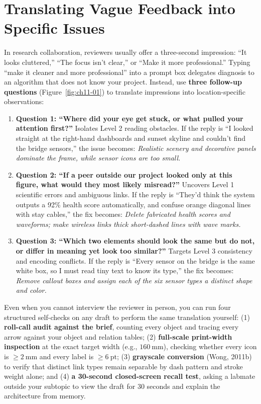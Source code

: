 \section{Translating Vague Feedback into Specific Issues}

In research collaboration, reviewers usually offer a three-second impression: ``It looks cluttered,'' ``The focus isn't clear,'' or ``Make it more professional.'' Typing ``make it cleaner and more professional'' into a prompt box delegates diagnosis to an algorithm that does not know your project. Instead, use \textbf{three follow-up questions} (Figure~\ref{fig:ch11-01}) to translate impressions into location-specific observations:

\begin{enumerate}
\item \textbf{Question 1: ``Where did your eye get stuck, or what pulled your attention first?''} Isolates Level 2 reading obstacles. If the reply is ``I looked straight at the right-hand dashboards and sunset skyline and couldn't find the bridge sensors,'' the issue becomes: \emph{Realistic scenery and decorative panels dominate the frame, while sensor icons are too small.}
\item \textbf{Question 2: ``If a peer outside our project looked only at this figure, what would they most likely misread?''} Uncovers Level 1 scientific errors and ambiguous links. If the reply is ``They'd think the system outputs a 92\% health score automatically, and confuse orange diagonal lines with stay cables,'' the fix becomes: \emph{Delete fabricated health scores and waveforms; make wireless links thick short-dashed lines with wave marks.}
\item \textbf{Question 3: ``Which two elements should look the same but do not, or differ in meaning yet look too similar?''} Targets Level 3 consistency and encoding conflicts. If the reply is ``Every sensor on the bridge is the same white box, so I must read tiny text to know its type,'' the fix becomes: \emph{Remove callout boxes and assign each of the six sensor types a distinct shape and color.}
\end{enumerate}

Even when you cannot interview the reviewer in person, you can run four structured self-checks on any draft to perform the same translation yourself: (1) \textbf{roll-call audit against the brief}, counting every object and tracing every arrow against your object and relation tables; (2) \textbf{full-scale print-width inspection} at the exact target width (e.g., $160\ \text{mm}$), checking whether every icon is $\ge 2\ \text{mm}$ and every label is $\ge 6\ \text{pt}$; (3) \textbf{grayscale conversion} (Wong, 2011b) to verify that distinct link types remain separable by dash pattern and stroke weight alone; and (4) \textbf{a 30-second closed-screen recall test}, asking a labmate outside your subtopic to view the draft for 30 seconds and explain the architecture from memory.

